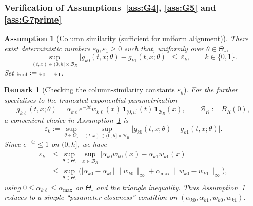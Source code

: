 \documentclass{statsoc}
\newtheorem{assumption}[assumption]{Assumption}
\newtheorem{remark}[remark]{Remark}
\newcommand{\1}{\mathbbm{1}}
\begin{document}
\subsubsection{Verification of Assumptions~\ref{ass:G4}, \ref{ass:G5} and \ref{ass:G7prime}}\label{app:hawkes-align}


\begin{assumption}[Column similarity (sufficient for uniform alignment)]
\label{ass:col-sim}
There exist deterministic numbers $\varepsilon_0,\varepsilon_1\ge 0$ such that, uniformly over $\theta\in\Theta_\circ$,
\[
\sup_{(t,x)\in(0,h]\times \mathcal B_R}
\big|g_{k0}(t,x;\theta)-g_{k1}(t,x;\theta)\big|
\ \le\ \varepsilon_k,
\qquad k\in\{0,1\}.
\]
Set $\varepsilon_{\rm col}:=\varepsilon_0+\varepsilon_1$.
\end{assumption}

\begin{remark}[Checking the column-similarity constants $\varepsilon_k$]\label{rem:epsk-check}
For the further specialises to the truncated exponential parametrization
\[
g_{k\ell}(t,x;\theta)
=\alpha_{k\ell}e^{-\beta t}w_{k\ell}(x)\,\mathbf 1_{(0,h]}(t)\,\mathbf 1_{\mathcal B_R}(x),
\qquad \mathcal B_R:=B_R(0),
\]
a convenient choice in Assumption~\ref{ass:col-sim} is
\[
\varepsilon_k
:=\sup_{\theta\in\Theta_\circ}\ \sup_{(t,x)\in(0,h]\times\mathcal B_R}
\big|g_{k0}(t,x;\theta)-g_{k1}(t,x;\theta)\big|.
\]
Since $e^{-\beta t}\le 1$ on $(0,h]$, we have
\begin{align*}
\varepsilon_k
&\le \sup_{\theta\in\Theta_\circ}\ \sup_{x\in\mathcal B_R}
\big|\alpha_{k0}w_{k0}(x)-\alpha_{k1}w_{k1}(x)\big| \\
&\le \sup_{\theta\in\Theta_\circ}
\Big(
|\alpha_{k0}-\alpha_{k1}|\,\|w_{k0}\|_\infty
+\alpha_{\max}\,\|w_{k0}-w_{k1}\|_\infty
\Big),
\end{align*}
using $0\le \alpha_{k\ell}\le \alpha_{\max}$ on $\Theta_\circ$ and the triangle inequality.
Thus Assumption~\ref{ass:col-sim} reduces to a simple ``parameter closeness'' condition on
$(\alpha_{k0},\alpha_{k1},w_{k0},w_{k1})$.
\end{remark}
\end{document}
